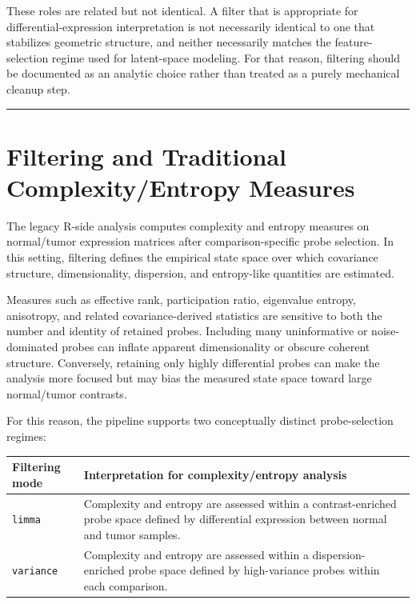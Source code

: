 \documentclass[
  letterpaper,
  DIV=11,
  numbers=noendperiod,
  openany,
  oneside]{scrreprt}
\begin{document}
These roles are related but not identical. A filter that is appropriate
for differential-expression interpretation is not necessarily identical
to one that stabilizes geometric structure, and neither necessarily
matches the feature-selection regime used for latent-space modeling. For
that reason, filtering should be documented as an analytic choice rather
than treated as a purely mechanical cleanup step.

\begin{center}\rule{0.5\linewidth}{0.5pt}\end{center}

\section{Filtering and Traditional Complexity/Entropy
Measures}\label{filtering-and-traditional-complexityentropy-measures}

The legacy R-side analysis computes complexity and entropy measures on
normal/tumor expression matrices after comparison-specific probe
selection. In this setting, filtering defines the empirical state space
over which covariance structure, dimensionality, dispersion, and
entropy-like quantities are estimated.

Measures such as effective rank, participation ratio, eigenvalue
entropy, anisotropy, and related covariance-derived statistics are
sensitive to both the number and identity of retained probes. Including
many uninformative or noise-dominated probes can inflate apparent
dimensionality or obscure coherent structure. Conversely, retaining only
highly differential probes can make the analysis more focused but may
bias the measured state space toward large normal/tumor contrasts.

For this reason, the pipeline supports two conceptually distinct
probe-selection regimes:

\begin{longtable}[]{@{}
  >{\raggedright\arraybackslash}p{}
  >{\raggedright\arraybackslash}p{}@{}}
\toprule\noalign{}
\begin{minipage}[b]{\linewidth}\raggedright
Filtering mode
\end{minipage} & \begin{minipage}[b]{\linewidth}\raggedright
Interpretation for complexity/entropy analysis
\end{minipage} \\
\midrule\noalign{}
\endhead
\bottomrule\noalign{}
\endlastfoot
\texttt{limma} & Complexity and entropy are assessed within a
contrast-enriched probe space defined by differential expression between
normal and tumor samples. \\
\texttt{variance} & Complexity and entropy are assessed within a
dispersion-enriched probe space defined by high-variance probes within
each comparison. \\
\end{longtable}
\end{document}
